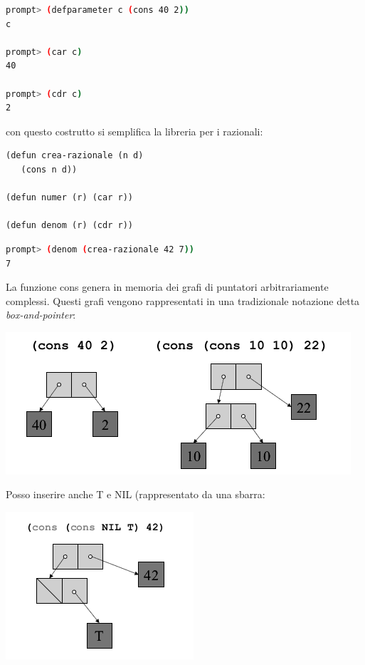 \documentclass[a4paper,12pt, oneside]{book}
\begin{document}
\begin{shaded}
	\begin{lstlisting}[language=bash]
prompt> (defparameter c (cons 40 2))
c

prompt> (car c)
40

prompt> (cdr c)
2
\end{lstlisting}
\end{shaded}
con questo costrutto si semplifica la libreria per i razionali:
\begin{verbatim}
(defun crea-razionale (n d)
   (cons n d))

(defun numer (r) (car r))

(defun denom (r) (cdr r))
\end{verbatim}
\begin{shaded}
	\begin{lstlisting}[language=bash]
prompt> (denom (crea-razionale 42 7))
7
\end{lstlisting}
\end{shaded}
La funzione cons genera in memoria dei grafi di puntatori
arbitrariamente complessi. Questi grafi vengono rappresentati in una tradizionale notazione detta \textit{box-and-pointer}:
\begin{center}
	\includegraphics[scale=0.7]{img/cons.png}
\end{center}
Posso inserire anche T e NIL (rappresentato da una sbarra:
\begin{center}
	\includegraphics[scale=0.7]{img/cons2.png}
\end{center}
\end{document}

